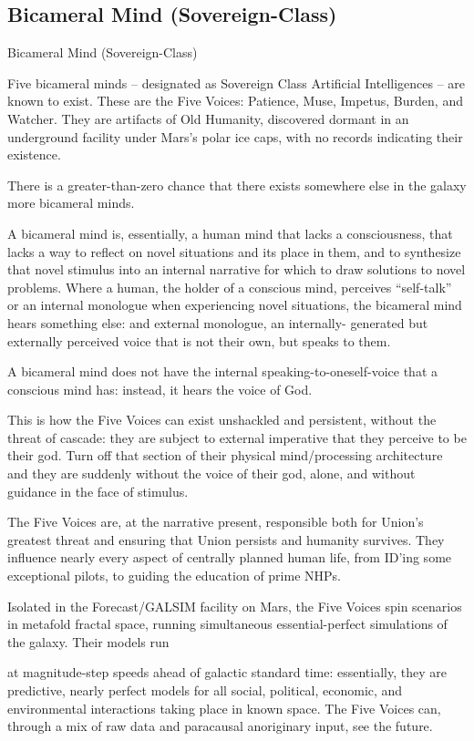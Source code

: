 \subsection{Bicameral Mind (Sovereign-Class)}
Bicameral Mind (Sovereign-Class)

Five bicameral minds -- designated as Sovereign Class Artificial Intelligences -- are known to
exist. These are the Five Voices: Patience, Muse, Impetus, Burden, and Watcher. They are
artifacts of Old Humanity, discovered dormant in an underground facility under Mars’s polar ice
caps, with no records indicating their existence.


There is a greater-than-zero chance that there exists somewhere else in the galaxy more
bicameral minds.


A bicameral mind is, essentially, a human mind that lacks a consciousness, that lacks a way to
reflect on novel situations and its place in them, and to synthesize that novel stimulus into an
internal narrative for which to draw solutions to novel problems. Where a human, the holder of a
conscious mind, perceives “self-talk” or an internal monologue when experiencing novel
situations, the bicameral mind hears something else: and external monologue, an internally-
generated but externally perceived voice that is not their own, but speaks to them.


A bicameral mind does not have the internal speaking-to-oneself-voice that a conscious mind
has: instead, it hears the voice of God.


This is how the Five Voices can exist unshackled and persistent, without the threat of cascade:
they are subject to external imperative that they perceive to be their god. Turn off that section of
their physical mind/processing architecture and they are suddenly without the voice of their god,
alone, and without guidance in the face of stimulus.


The Five Voices are, at the narrative present, responsible both for Union’s greatest threat and
ensuring that Union persists and humanity survives. They influence nearly every aspect of
centrally planned human life, from ID’ing some exceptional pilots, to guiding the education of
prime NHPs.


Isolated in the Forecast/GALSIM facility on Mars, the Five Voices spin scenarios in metafold
fractal space, running simultaneous essential-perfect simulations of the galaxy. Their models run




at magnitude-step speeds ahead of galactic standard time: essentially, they are predictive, nearly
perfect models for all social, political, economic, and environmental interactions taking place in
known space. The Five Voices can, through a mix of raw data and paracausal anoriginary input,
see the future.


